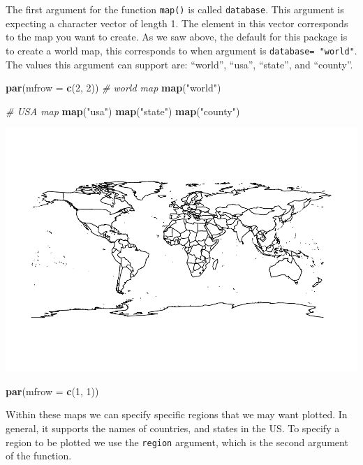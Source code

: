 \documentclass[
]{book}
\newenvironment{Shaded}{\begin{snugshade}}{\end{snugshade}}
\newcommand{\CommentTok}[1]{\textcolor[rgb]{0.56,0.35,0.01}{\textit{#1}}}
\newcommand{\DataTypeTok}[1]{\textcolor[rgb]{0.13,0.29,0.53}{#1}}
\newcommand{\DecValTok}[1]{\textcolor[rgb]{0.00,0.00,0.81}{#1}}
\newcommand{\KeywordTok}[1]{\textcolor[rgb]{0.13,0.29,0.53}{\textbf{#1}}}
\newcommand{\NormalTok}[1]{#1}
\newcommand{\StringTok}[1]{\textcolor[rgb]{0.31,0.60,0.02}{#1}}
\begin{document}
The first argument for the function \texttt{map()} is called \texttt{database}. This argument is expecting a character vector of length 1. The element in this vector corresponds to the map you want to create. As we saw above, the default for this package is to create a world map, this corresponds to when argument is \texttt{database=\ "world"}. The values this argument can support are: ``world'', ``usa'', ``state'', and ``county''.

\begin{Shaded}
\begin{Highlighting}[]
\KeywordTok{par}\NormalTok{(}\DataTypeTok{mfrow =} \KeywordTok{c}\NormalTok{(}\DecValTok{2}\NormalTok{, }\DecValTok{2}\NormalTok{))}
\CommentTok{# world map}
\KeywordTok{map}\NormalTok{(}\StringTok{"world"}\NormalTok{)}

\CommentTok{# USA map}
\KeywordTok{map}\NormalTok{(}\StringTok{"usa"}\NormalTok{)}
\KeywordTok{map}\NormalTok{(}\StringTok{"state"}\NormalTok{)}
\KeywordTok{map}\NormalTok{(}\StringTok{"county"}\NormalTok{)}
\end{Highlighting}
\end{Shaded}

\includegraphics{_main_files/figure-latex/unnamed-chunk-194-1.pdf}

\begin{Shaded}
\begin{Highlighting}[]
\KeywordTok{par}\NormalTok{(}\DataTypeTok{mfrow =} \KeywordTok{c}\NormalTok{(}\DecValTok{1}\NormalTok{, }\DecValTok{1}\NormalTok{))}
\end{Highlighting}
\end{Shaded}

Within these maps we can specify specific regions that we may want plotted. In general, it supports the names of countries, and states in the US. To specify a region to be plotted we use the \texttt{region} argument, which is the second argument of the function.
\end{document}

